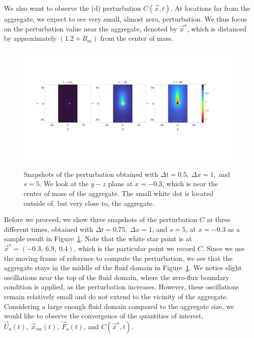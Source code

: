 We also want to observe the (d) perturbation $C(\vec{x},t)$. At locations far from the aggregate, we expect to see very small, almost zero, perturbation.
We thus focus on the perturbation value near the aggregate, denoted by $\vec{x}^{\star}$, which is distanced by approximately $(1.2 + R_m)$ from the center of mass. 
\par
\begin{figure}[ht]
	\begin{center}
		\includegraphics[scale=0.26]{./figures/fig_NC10_snaps_all.pdf}
		\caption{Snapshots of the perturbation obtained with $\Delta t = 0.5, \ \Delta x = 1,$ and $s = 5$. We look at the $y-z$ plane at $x = -0.3$, which is near the center of mass of the aggregate. The small white dot is located outside of, but very close to, the aggregate.}
		\label{fig_NC10_snaps_all}
	\end{center}
\end{figure}
Before we proceed, we show three snapshots of the perturbation $C$ at three different times, obtained with $\Delta t = 0.75, \ \Delta x = 1$, and $s = 5$, at $x = -0.3$ as a sample result in Figure~\ref{fig_NC10_snaps_all}. Note that the white star point is at ${\vec{x}^{\star}} = (-0.3, \    6.9, \      0.4)$, which is the particular point we record $C$. Since we use the moving frame of reference to compute the perturbation, we see that the aggregate stays in the middle of the fluid domain in Figure~\ref{fig_NC10_snaps_all}.
We notice slight oscillations near the top of the fluid domain, where the zero-flux boundary condition is applied, as the perturbation increases. 
However, these oscillations remain relatively small and do not extend to the vicinity of the aggregate. 
Considering a large enough fluid domain compared to the aggregate size, we would like to observe the convergence of the quantities of interest, $\vec{U}_a(t), \ \vec{x}_{cm} (t), \ \vec{F}_o(t)$, and $C(\vec{x}^{\star}, t)$.
